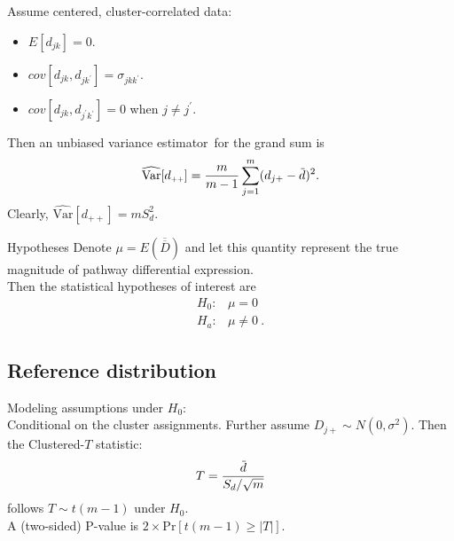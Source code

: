\documentclass[a0,portrait]{a0poster}
\newcommand*{\barbar}[1]{\overline{\overline{#1}}}
\newcommand{\overbar}[1]{\mkern 3mu\overline{\mkern-3mu#1\mkern-1.mu}\mkern 1.mu}
\begin{document}
\begin{multicols}{3}
Assume centered, cluster-correlated data:

\begin{itemize}
  
\item{$E[d_{jk}]=0$}.
  
\item{$cov[d_{jk},d_{jk^{\prime}}]=\sigma_{jkk^{\prime}}$}.
  
\item{$cov[d_{jk},d_{j^{\prime}k^{\prime}}]=0$ when $j\neq j^{\prime}$}.
  
\end{itemize}

Then an unbiased variance estimator\footnotemark~for the grand sum is
\begin{equation*}
\label{eq:var}
\widehat{\text{Var}}[d_{\scriptscriptstyle{++}}] = \frac{m}{m-1}\sum_{j=1}^m(d_{j+} - \overbar{d})^2.
\end{equation*}
Clearly, $\widehat{\text{Var}}[d_{\scriptscriptstyle{++}}] = mS_d^2$.


Hypotheses
  Denote $\mu = E\left(\barbar{D}\right)$ and let this quantity represent the true magnitude of pathway differential expression.\\
  \vskip6pt
  {Then the statistical hypotheses of interest are}
    \begin{equation*}
      \label{eq:hypotheses}
      \begin{array}{rl}
        H_{0}: & \mu = 0 \\
        H_{a}: & \mu \neq 0 \ .
      \end{array}
    \end{equation*}


\subsection{Reference distribution}
Modeling assumptions under $H_0$:\\
Conditional on the cluster assignments.
Further assume $D_{j\scriptscriptstyle{+}} \sim N(0, \sigma^2)$.
Then the Clustered-$T$ statistic{\footnotemark}:\\
\begin{equation*}
  \label{eq:tstat}
T =  \frac{\overbar{d}}{S_d/\sqrt{m}}
\end{equation*}
follows $T \sim t(m-1)$ under $H_0$. \\
A (two-sided) P-value is $2\times\text{Pr}[t(m-1) \ge |T|]$.


\end{multicols}
\end{document}
